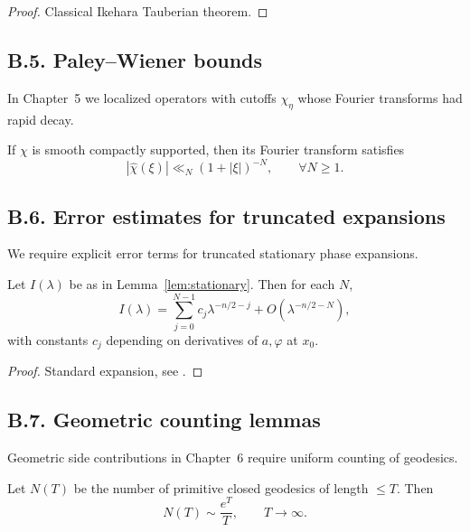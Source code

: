 \begin{proof}
Classical Ikehara Tauberian theorem.
\end{proof}

\subsection*{B.5. Paley–Wiener bounds}

\noindent
In Chapter~5 we localized operators with cutoffs $\chi_\eta$ whose Fourier
transforms had rapid decay.

\begin{lemma}\label{lem:paley}
If $\chi$ is smooth compactly supported, then its Fourier transform satisfies
\[
|\hat{\chi}(\xi)| \ll_N (1+|\xi|)^{-N},\qquad \forall N\ge 1.
\]
\end{lemma}

\subsection*{B.6. Error estimates for truncated expansions}

\noindent
We require explicit error terms for truncated stationary phase expansions.

\begin{proposition}\label{prop:stationary-error}
Let $I(\lambda)$ be as in Lemma~\ref{lem:stationary}. Then for each $N$,
\[
I(\lambda) = \sum_{j=0}^{N-1} c_j \lambda^{-n/2-j} + O(\lambda^{-n/2-N}),
\]
with constants $c_j$ depending on derivatives of $a,\varphi$ at $x_0$.
\end{proposition}

\begin{proof}
Standard expansion, see \cite[Chap.~7]{Hormander1983}.
\end{proof}

\subsection*{B.7. Geometric counting lemmas}

\noindent
Geometric side contributions in Chapter~6 require uniform counting of geodesics.

\begin{lemma}\label{lem:geo-count}
Let $N(T)$ be the number of primitive closed geodesics of length $\le T$. Then
\[
N(T) \sim \frac{e^T}{T},\qquad T\to\infty.
\]
\end{lemma}

